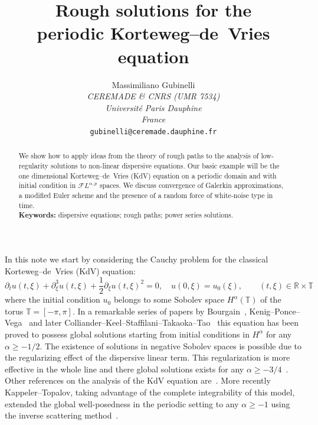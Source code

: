 \documentclass[a4paper,11pt,reqno]{article}
\newcommand{\RR}{\mathbb{R}}
\newcommand{\TT}{\mathbb{T}}
\newcommand{\FF}{\mathcal{F}}
\begin{document}
\title{Rough solutions for the\\ periodic Korteweg--de~Vries equation}
\author{
  { Massimiliano Gubinelli}              \\
{\small\it CEREMADE \& CNRS (UMR 7534) }\\[-0.1cm]
  {\small\it  Universit\'e Paris Dauphine}          \\[-0.1cm]
{\small \it  France}\\[-0.1cm] 
 {\small  {\tt gubinelli@ceremade.dauphine.fr}}   
}
\maketitle


\begin{abstract}
We show how to apply ideas from the theory of rough paths to the analysis of low-regularity solutions to non-linear dispersive equations. Our basic example will be the one dimensional Korteweg--de~Vries (KdV) equation on a periodic
domain and with initial condition in $\FF L^{\alpha,p}$ spaces.  We discuss
convergence of Galerkin approximations, a modified Euler scheme and the presence of a random force of white-noise type in time. \\[0.5cm]
\textbf{Keywords:} dispersive equations; rough paths; power series solutions.

\end{abstract}

In this note we start by considering the Cauchy problem for the
 classical   Korteweg--de~Vries (KdV) equation:
\begin{equation}
  \label{eq:kdv-real}
\partial_t u(t,\xi) + \partial^3_\xi u(t,\xi) +
\frac12 \partial_\xi u(t,\xi)^2 = 0,\quad u(0,\xi) = u_0(\xi), \qquad
(t,\xi)\in\RR\times \TT  
\end{equation}
where  the initial condition $u_0$ belongs to some Sobolev space $H^\alpha(\TT)$
of the torus $\TT = [-\pi,\pi]$. In a remarkable series of papers by Bourgain~\cite{MR1215780,MR1423623},
Kenig--Ponce--Vega~\cite{MR1329387,MR1230283,MR1086966} and later Colliander--Keel--Staffilani--Takaoka--Tao~\cite{MR1969209} this equation has been proved to possess global
solutions starting from initial conditions in $H^\alpha$ for any
$\alpha \ge -1/2$.   The existence of solutions in negative Sobolev spaces is possible due to the
regularizing effect of the dispersive linear term. This regularization
is more effective in the whole line and there global solutions exists for any $\alpha \ge -3/4$~\cite{MR1230283,MR1969209,Guo2009583}. Other references on the analysis of the KdV equation are~\cite{MR1019307,MR759907}.
More recently  Kappeler--Topalov, taking advantage of the complete integrability of this model, extended the global well-posedness in the periodic setting to any $\alpha \ge -1$ using the inverse scattering method~\cite{MR2181576}.  
\end{document}
